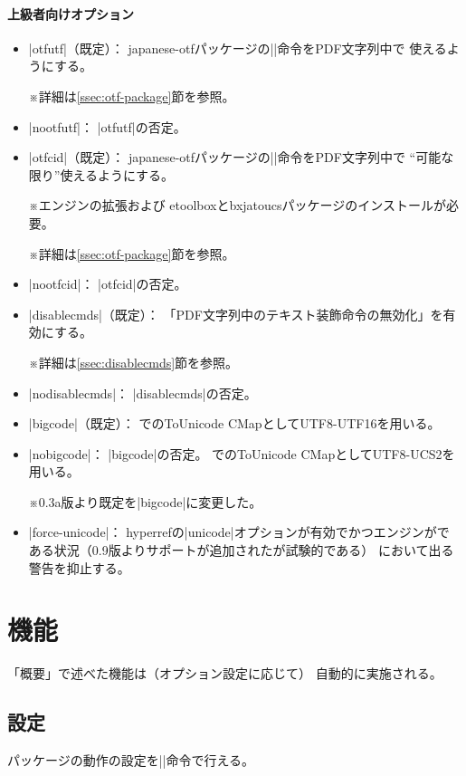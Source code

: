 \documentclass[uplatex,dvipdfmx,a4paper]{jsarticle}
\renewcommand{\headfont}{\gtfamily\romanseries{sbc}\sffamily}
\newcommand{\Pkg}[1]{\textsf{#1}}
\newcommand{\Note}{\par\noindent ※}
\newcommand{\Means}{：\quad}
\providecommand{\Strong}[1]{{\headfont#1}}
\begin{document}
\paragraph{上級者向けオプション}\mbox{}
\begin{itemize}
\item |otfutf|（既定）\Means
  \Pkg{japanese-otf}パッケージの|\UTF|命令をPDF文字列中で
  使えるようにする。
  \Note 詳細は\ref{ssec:otf-package}節を参照。
\item |nootfutf|\Means
  |otfutf|の否定。
\item |otfcid|（既定）\Means
  \Pkg{japanese-otf}パッケージの|\CID|命令をPDF文字列中で
  “可能な限り”使えるようにする。
  \Note エンジンの{\eTeX}拡張および
  \Pkg{etoolbox}と\Pkg{bxjatoucs}パッケージのインストールが必要。
  \Note 詳細は\ref{ssec:otf-package}節を参照。
\item |nootfcid|\Means
  |otfcid|の否定。
\item |disablecmds|（既定）\Means
  「PDF文字列中のテキスト装飾命令の無効化」を有効にする。
  \Note 詳細は\ref{ssec:disablecmds}節を参照。
\item |nodisablecmds|\Means
  |disablecmds|の否定。
\item |bigcode|（既定）\Means
  {\upTeX}でのToUnicode CMapとしてUTF8-UTF16を用いる。
\item |nobigcode|\Means
  |bigcode|の否定。
  {\upTeX}でのToUnicode CMapとしてUTF8-UCS2を用いる。
  \Note 0.3a版より既定を|bigcode|に変更した。
\item |force-unicode|\Means
  \Pkg{hyperref}の|unicode|オプションが有効でかつエンジンが{\pTeX}で
  ある状況（0.9版よりサポートが追加されたが\Strong{試験的}である）
  において出る警告を抑止する。
\end{itemize}

\section{機能}

「概要」で述べた機能は（オプション設定に応じて）
自動的に実施される。

\subsection{設定}
\label{ssec:setup}

パッケージの動作の設定を|\pxjahypersetup|命令で行える。
\end{document}
